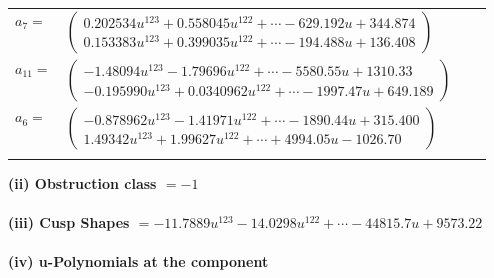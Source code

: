 \documentclass[1p]{elsarticle_modified}
\theoremstyle{definition}
\begin{document}
\begin{tabular}{m{7pt} m{180pt} m{7pt} m{180pt} }
\flushright $a_{7}=$&$\begin{pmatrix}0.202534 u^{123}+0.558045 u^{122}+\cdots-629.192 u+344.874\\0.153383 u^{123}+0.399035 u^{122}+\cdots-194.488 u+136.408\end{pmatrix}$ \\
\flushright $a_{11}=$&$\begin{pmatrix}-1.48094 u^{123}-1.79696 u^{122}+\cdots-5580.55 u+1310.33\\-0.195990 u^{123}+0.0340962 u^{122}+\cdots-1997.47 u+649.189\end{pmatrix}$ \\
\flushright $a_{6}=$&$\begin{pmatrix}-0.878962 u^{123}-1.41971 u^{122}+\cdots-1890.44 u+315.400\\1.49342 u^{123}+1.99627 u^{122}+\cdots+4994.05 u-1026.70\end{pmatrix}$\\&\end{tabular}
\flushleft \textbf{(ii) Obstruction class $= -1$}\\~\\
\flushleft \textbf{(iii) Cusp Shapes $= -11.7889 u^{123}-14.0298 u^{122}+\cdots-44815.7 u+9573.22$}\\~\\
\newpage\renewcommand{\arraystretch}{1}
\flushleft \textbf{(iv) u-Polynomials at the component}\newline \\
\end{document}
